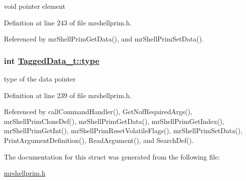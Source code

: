 void pointer element 



Definition at line 243 of file mrshellprim.h.

Referenced by mr\-Shell\-Prim\-Get\-Data(), and mr\-Shell\-Prim\-Set\-Data().\hypertarget{structTaggedData__t_d577c1ca9cfb883e8f61383aee2eb9b4}{
\subsubsection[type]{\setlength{\rightskip}{0pt plus 5cm}int \hyperlink{structTaggedData__t_d577c1ca9cfb883e8f61383aee2eb9b4}{Tagged\-Data\_\-t::type}}}
\label{structTaggedData__t_d577c1ca9cfb883e8f61383aee2eb9b4}


type of the data pointer 



Definition at line 239 of file mrshellprim.h.

Referenced by call\-Command\-Handler(), Get\-Nof\-Required\-Args(), mr\-Shell\-Prim\-Clone\-Def(), mr\-Shell\-Prim\-Get\-Data(), mr\-Shell\-Prim\-Get\-Index(), mr\-Shell\-Prim\-Get\-Int(), mr\-Shell\-Prim\-Reset\-Volatile\-Flags(), mr\-Shell\-Prim\-Set\-Data(), Print\-Argument\-Definition(), Read\-Argument(), and Search\-Def().

The documentation for this struct was generated from the following file:\begin{CompactItemize}
\item 
\hyperlink{mrshellprim_8h}{mrshellprim.h}\end{CompactItemize}
